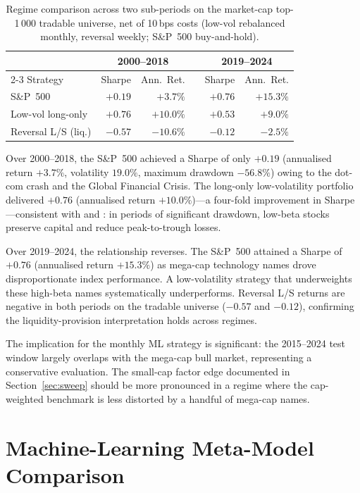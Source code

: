 \documentclass[11pt,a4paper]{article}
\begin{document}
\begin{table}[h]
\centering\small
\caption{Regime comparison across two sub-periods on the market-cap top-1\,000
tradable universe, net of 10\,bps costs (low-vol rebalanced monthly, reversal
weekly; S\&P~500 buy-and-hold).}
\label{tab:regime}
\begin{tabular}{lrrrrr}
\toprule
& \multicolumn{2}{c}{2000--2018} & & \multicolumn{2}{c}{2019--2024} \\
\cmidrule{2-3}\cmidrule{5-6}
Strategy & Sharpe & Ann.\ Ret. && Sharpe & Ann.\ Ret. \\
\midrule
S\&P~500            & $+0.19$ & $+3.7\%$  && $+0.76$ & $+15.3\%$ \\
Low-vol long-only   & $+0.76$ & $+10.0\%$ && $+0.53$ & $+9.0\%$ \\
Reversal L/S (liq.) & $-0.57$ & $-10.6\%$ && $-0.12$ & $-2.5\%$ \\
\bottomrule
\end{tabular}
\end{table}

Over 2000--2018, the S\&P~500 achieved a Sharpe of only $+0.19$ (annualised
return $+3.7\%$, volatility $19.0\%$, maximum drawdown $-56.8\%$) owing to the
dot-com crash and the Global Financial Crisis. The long-only low-volatility
portfolio delivered $+0.76$ (annualised return $+10.0\%$)---a four-fold
improvement in Sharpe---consistent with
\citet{baker2011} and \citet{frazzinipedersen2014}: in periods of significant
drawdown, low-beta stocks preserve capital and reduce peak-to-trough losses.

Over 2019--2024, the relationship reverses. The S\&P~500 attained a Sharpe of
$+0.76$ (annualised return $+15.3\%$) as mega-cap technology names drove
disproportionate index performance. A low-volatility strategy that underweights
these high-beta names systematically underperforms. Reversal L/S returns are
negative in both periods on the tradable universe ($-0.57$ and $-0.12$),
confirming the liquidity-provision interpretation holds across regimes.

The implication for the monthly ML strategy is significant: the 2015--2024 test
window largely overlaps with the mega-cap bull market, representing a
conservative evaluation. The small-cap factor edge documented in
Section~\ref{sec:sweep} should be more pronounced in a regime where the
cap-weighted benchmark is less distorted by a handful of mega-cap names.

\section{Machine-Learning Meta-Model Comparison}
\label{sec:ml}
\end{document}
